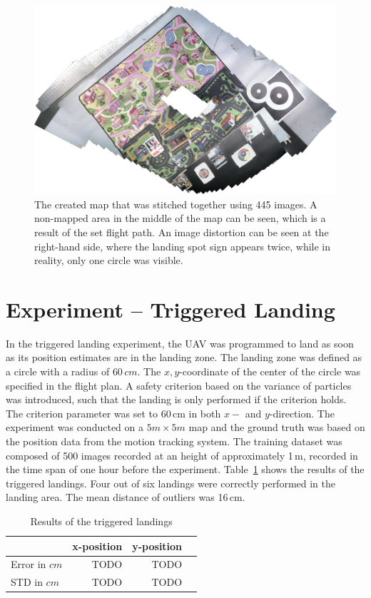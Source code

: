 \documentclass{report}
\begin{document}
\begin{figure}[h!]
\begin{center}
\includegraphics[width=0.7\columnwidth]{map_rotated}
\caption{{\label{fig:mapexp} The created map that was stitched
    together using 445 images. A non-mapped area in the middle of the
    map can be seen, which is a result of the set flight path. An
    image distortion can be seen at the right-hand side, where the
    landing spot sign appears twice, while in reality, only one circle
    was visible.%
  }}
\end{center}
\end{figure}


\section{Experiment -- Triggered Landing}
\label{sec:triggered}

In the triggered landing experiment, the UAV was programmed to land as
soon as its position estimates are in the landing zone. The landing
zone was defined as a circle with a radius of $60\,cm$. The
$x,y$-coordinate of the center of the circle was specified in the
flight plan. A safety criterion based on the variance of particles was
introduced, such that the landing is only performed if the criterion
holds. The criterion parameter was set to 60\,cm in both $x-$ and
$y$-direction. The experiment was conducted on a $5m \times 5m$ map
and the ground truth was based on the position data from the motion
tracking system. The training dataset was composed of 500 images
recorded at an height of approximately 1\,m, recorded in the time span
of one hour before the experiment. Table~\ref{tab:targetlanding} shows the results of the triggered
landings. Four out of six landings were correctly performed in the
landing area. The mean distance of outliers was 16\,cm.
\begin{table}[H]
  \centering
  \begin{tabular}{lrrr}
    \toprule
    & x-position & y-position\\
    \midrule
    Error in $cm$ & TODO & TODO\\
    STD in $cm$ & TODO & TODO\\
    \bottomrule
  \end{tabular}
  \caption[Triggered landings]{Results of the triggered landings}
  \label{tab:targetlanding}

\end{table}
\end{document}
